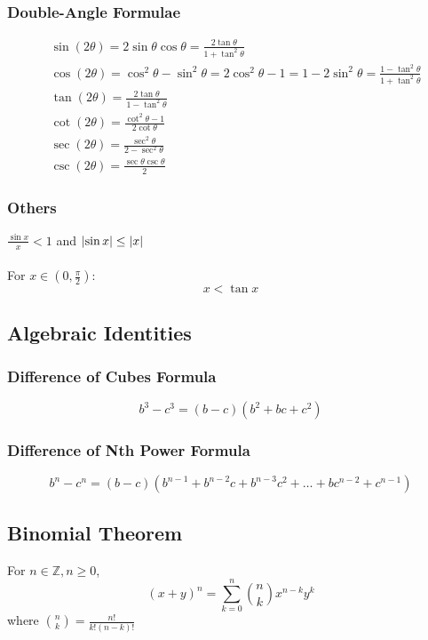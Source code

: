\documentclass[../ma2002_notes.tex]{subfiles}
\begin{document}
\subsubsection{Double-Angle Formulae}
\begin{align*}
	&\sin(2\theta)=2\sin\theta\cos\theta=\frac{2\tan\theta}{1+\tan^2\theta}\\
	&\cos(2\theta)=\cos^2\theta-\sin^2\theta=2\cos^2\theta-1=1-2\sin^2\theta=\frac{1-\tan^2\theta}{1+\tan^2\theta}\\
	&\tan(2\theta)=\frac{2\tan\theta}{1-\tan^2\theta}\\
	&\cot(2\theta)=\frac{\cot^2\theta-1}{2\cot\theta}\\
	&\sec(2\theta)=\frac{\sec^2\theta}{2-\sec^2\theta}\\
	&\csc(2\theta)=\frac{\sec\theta\csc\theta}{2}
\end{align*}

\subsubsection{Others}
\(\frac{\sin x}{x} < 1\) and \(\lvert\sin x\rvert \leq \lvert x\rvert\) \\ \\
For \(x \in (0, \frac{\pi}{2})\):
\[x < \tan x\]

\subsection{Algebraic Identities}
\subsubsection{Difference of Cubes Formula}
\[b^3-c^3=(b-c)(b^2+bc+c^2)\]

\subsubsection{Difference of Nth Power Formula}
\[b^n-c^n=(b-c)(b^{n-1}+b^{n-2}c+b^{n-3}c^2+\ldots+bc^{n-2}+c^{n-1})\]

\subsection{Binomial Theorem}
For \(n\in\mathbb{Z},n\geq0\),
\[(x+y)^n=\sum_{k=0}^{n}\binom{n}{k}x^{n-k}y^k\]
where \(\displaystyle\binom{n}{k}=\frac{n!}{k!(n-k)!}\)
\end{document}
